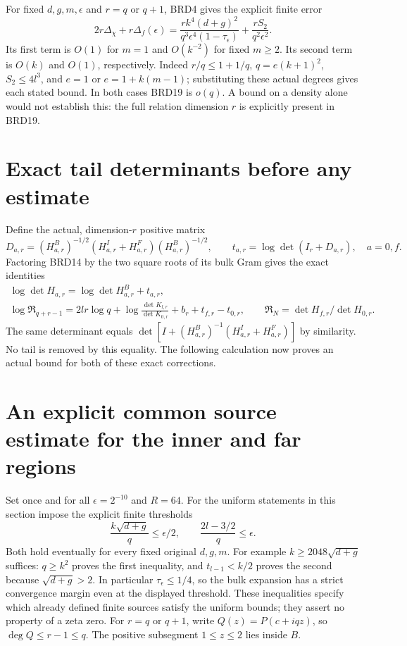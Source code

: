 \documentclass[11pt,a4paper]{article}
\begin{document}
For fixed $d,g,m,\epsilon$ and $r=q$ or $q+1$, BRD4 gives
the explicit finite error
\[
 2r\Delta_\chi+r\Delta_f(\epsilon)
 =\frac{r k^4(d+g)^2}{q^3\epsilon^4(1-\tau_\epsilon)}
   +\frac{rS_2}{q^2\epsilon^2}.\tag{BRD19}
\]
Its first term is $O(1)$ for $m=1$ and $O(k^{-2})$ for fixed
$m\geq2$. Its second term is $O(k)$ and $O(1)$, respectively.
Indeed $r/q\leq1+1/q$, $q=e(k+1)^2$,
$S_2\leq4l^3$, and $e=1$ or $e=1+k(m-1)$; substituting these
actual degrees gives each stated bound. In both cases BRD19
is $o(q)$. A bound on a density alone would not establish this:
the full relation dimension $r$ is explicitly present in BRD19.

\section{Exact tail determinants before any estimate}

Define the actual, dimension-$r$ positive matrix
\[
 D_{a,r}=(H_{a,r}^B)^{-1/2}
       (H_{a,r}^I+H_{a,r}^F)(H_{a,r}^B)^{-1/2},
 \qquad t_{a,r}=\log\det(I_r+D_{a,r}),\quad a=0,f.
\tag{BRD20}
\]
Factoring BRD14 by the two square roots of its bulk Gram gives
the exact identities
\[
\begin{gathered}
 \log\det H_{a,r}=\log\det H_{a,r}^B+t_{a,r},\\
 \log\mathfrak R_{q+r-1}
  =2lr\log q+\log\frac{\det K_{l,r}}{\det K_{0,r}}
                         +b_r+t_{f,r}-t_{0,r},
 \qquad\mathfrak R_N=\det H_{f,r}/\det H_{0,r}.
\end{gathered}\tag{BRD21}
\]
The same determinant equals
$\det[I+(H_{a,r}^B)^{-1}(H_{a,r}^I+H_{a,r}^F)]$ by similarity.
No tail is removed by this equality. The following calculation
now proves an actual bound for both of these exact corrections.

\section{An explicit common source estimate for the inner and far regions}

Set once and for all $\epsilon=2^{-10}$ and $R=64$. For the
uniform statements in this section impose the explicit finite
thresholds
\[
 \frac{k\sqrt{d+g}}q\leq\epsilon/2,\qquad
 \frac{2l-3/2}{q}\leq\epsilon.\tag{BRD22}
\]
Both hold eventually for every fixed original $d,g,m$. For
example $k\geq2048\sqrt{d+g}$ suffices: $q\geq k^2$ proves
the first inequality, and $t_{l-1}<k/2$ proves the second
because $\sqrt{d+g}>2$. In particular
$\tau_\epsilon\leq1/4$, so the bulk expansion has a strict
convergence margin even at the displayed threshold. These inequalities
specify which already defined finite sources satisfy the uniform
bounds; they assert no property of a zeta zero. For $r=q$ or
$q+1$, write $Q(z)=P(c+iqz)$, so $\deg Q\leq r-1\leq q$.
The positive subsegment $1\leq z\leq2$ lies inside $B$.
\end{document}
